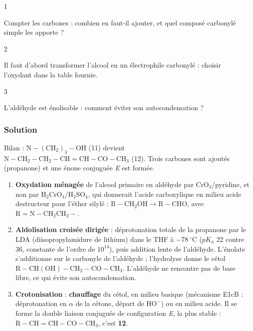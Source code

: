 \documentclass[11pt,a4paper]{article}
\providecommand{\tightlist}{\setlength{\itemsep}{0pt}\setlength{\parskip}{0pt}}
\begin{document}
\begin{indication}{1}

Compter les carbones : combien en faut-il ajouter, et quel composé carbonylé simple les apporte ?

\end{indication}

\begin{indication}{2}

Il faut d'abord transformer l'alcool en un électrophile carbonylé : choisir l'oxydant dans la table fournie.

\end{indication}

\begin{indication}{3}

L'aldéhyde est énolisable : comment éviter son autocondensation ?

\end{indication}

\hypertarget{solution-47}{%
\subsubsection{Solution}\label{solution-47}}

Bilan : \(\mathrm{N{-}(CH_2)_3{-}OH}\) (11) devient \(\mathrm{N{-}CH_2{-}CH_2{-}CH{=}CH{-}CO{-}CH_3}\) (12). Trois carbones sont ajoutés (propanone) et une énone conjuguée \emph{E} est formée.

\begin{enumerate}
\def\labelenumi{\arabic{enumi}.}
\tightlist
\item
  \textbf{Oxydation ménagée} de l'alcool primaire en aldéhyde par \(\mathrm{CrO_3}\)/pyridine, et non par \(\mathrm{H_2CrO_4}/\mathrm{H_2SO_4}\), qui donnerait l'acide carboxylique en milieu acide destructeur pour l'éther silylé : \(\mathrm{R{-}CH_2OH}\to\mathrm{R{-}CHO}\), avec \(\mathrm R=\mathrm{N{-}CH_2CH_2{-}}\).
\item
  \textbf{Aldolisation croisée dirigée} : déprotonation totale de la propanone par le LDA (diisopropylamidure de lithium) dans le THF à \(-78\ ^\circ\)C (\(pK_a\) 22 contre 36, constante de l'ordre de \(10^{14}\)), puis addition lente de l'aldéhyde. L'énolate s'additionne sur le carbonyle de l'aldéhyde ; l'hydrolyse donne le cétol \(\mathrm{R{-}CH(OH){-}CH_2{-}CO{-}CH_3}\). L'aldéhyde ne rencontre pas de base libre, ce qui évite son autocondensation.
\item
  \textbf{Crotonisation} : \textbf{chauffage} du cétol, en milieu basique (mécanisme E1cB : déprotonation en \(\alpha\) de la cétone, départ de \(\mathrm{HO^-}\)) ou en milieu acide. Il se forme la double liaison conjuguée de configuration \emph{E}, la plus stable : \(\mathrm{R{-}CH{=}CH{-}CO{-}CH_3}\), c'est \textbf{12}.
\end{enumerate}
\end{document}
